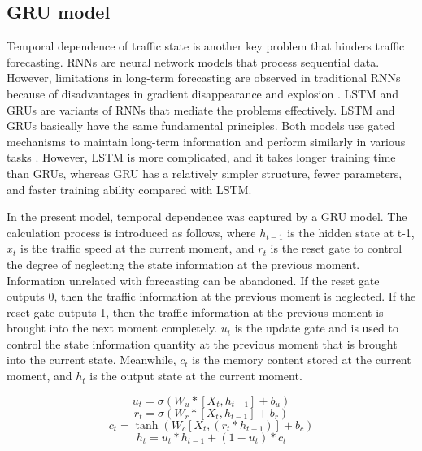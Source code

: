 \documentclass[10pt,journal,compsoc]{IEEEtran}
\begin{document}
\subsection{GRU model}
\par Temporal dependence of traffic state is another key problem that hinders traffic forecasting. RNNs are neural network models that process sequential data. However, limitations in long-term forecasting are observed in traditional RNNs because of disadvantages in gradient disappearance and explosion \cite{Bengio2002Learning}. LSTM \cite{Graves1997Long} and GRUs \cite{Cho2014On} are variants of RNNs that mediate the problems effectively. LSTM and GRUs basically have the same fundamental principles. Both models use gated mechanisms to maintain long-term information and perform similarly in various tasks \cite{chung2014empirical}. However, LSTM is more complicated, and it takes longer training time than GRUs, whereas GRU has a relatively simpler structure, fewer parameters, and faster training ability compared with LSTM.
\par In the present model, temporal dependence was captured by a GRU model. The calculation process is introduced as follows, where $h_{t-1}$ is the hidden state at t-1, $x_{t}$ is the traffic speed at the current moment, and $r_{t}$ is the reset gate to control the degree of neglecting the state information at the previous moment. Information unrelated with forecasting can be abandoned. If the reset gate outputs 0, then the traffic information at the previous moment is neglected. If the reset gate outputs 1, then the traffic information at the previous moment is brought into the next moment completely. $u_{t}$ is the update gate and is used to control the state information quantity at the previous moment that is brought into the current state. Meanwhile, $c_{t}$ is the memory content stored at the current moment, and $h_{t}$ is the output state at the current moment. 

\begin{equation}
u_{t}=\sigma(W_{u}\ast \left[X_{t},h_{t-1}\right]+b_{u})
\end{equation}
\begin{equation}
r_{t}=\sigma(W_{r}\ast \left[X_{t},h_{t-1}\right]+b_{r})
\end{equation}
\begin{equation}
c_{t}=\tanh(W_{c}\left[X_{t},(r_{t}*h_{t-1})\right]+b_{c})
\end{equation}
\begin{equation}
h_{t}=u_{t}*h_{t-1}+(1-u_{t})*c_{t}
\end{equation}
\end{document}
